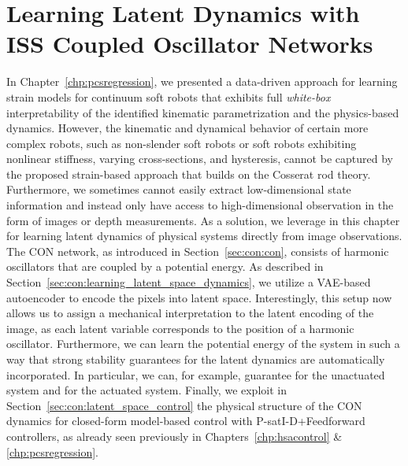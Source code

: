 \chapter{Learning Latent Dynamics with ISS Coupled Oscillator Networks}
\label{chp:con}

\begin{foreword}
    In Chapter~\ref{chp:pcsregression}, we presented a data-driven approach for learning strain models for continuum soft robots that exhibits full \emph{white-box} interpretability of the identified kinematic parametrization and the physics-based dynamics.
    However, the kinematic and dynamical behavior of certain more complex robots, such as non-slender soft robots or soft robots exhibiting nonlinear stiffness, varying cross-sections, and hysteresis, cannot be captured by the proposed strain-based approach that builds on the Cosserat rod theory.
    Furthermore, we sometimes cannot easily extract low-dimensional state information and instead only have access to high-dimensional observation in the form of images or depth measurements.
    As a solution, we leverage in this chapter  for learning latent dynamics of physical systems directly from image observations. The \gls{CON} network, as introduced in Section~\ref{sec:con:con}, consists of harmonic oscillators that are coupled by a potential energy. As described in Section~\ref{sec:con:learning_latent_space_dynamics}, we utilize a \gls{VAE}-based autoencoder to encode the pixels into latent space. Interestingly, this setup now allows us to assign a mechanical interpretation to the latent encoding of the image, as each latent variable corresponds to the position of a harmonic oscillator. Furthermore, we can learn the potential energy of the system in such a way that strong stability guarantees for the latent dynamics are automatically incorporated. In particular, we can, for example, guarantee  for the unactuated system and  for the actuated system.
    Finally, we exploit in Section~\ref{sec:con:latent_space_control} the physical structure of the \gls{CON} dynamics for closed-form model-based control with P-satI-D+Feedforward controllers, as already seen previously in Chapters~\ref{chp:hsacontrol} \& \ref{chp:pcsregression}.
\end{foreword}

